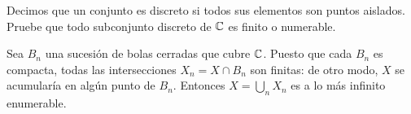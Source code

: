 \begin{exercise}
Decimos que un conjunto es discreto si todos sus elementos son puntos aislados. Pruebe que todo subconjunto discreto de $\mathbb C$ es finito o numerable.
\end{exercise}

\begin{solution}
Sea $B_n$ una sucesión de bolas cerradas que cubre $\mathbb C$. Puesto que cada $B_n$ es compacta, todas las intersecciones $X_n = X \cap B_n$ son finitas: de otro modo, $X$ se acumularía en algún punto de $B_n$. Entonces $X = \bigcup_n X_n$ es a lo más infinito enumerable.
\end{solution}
